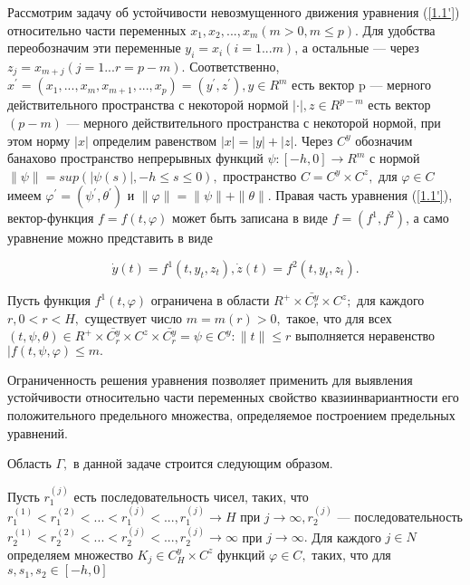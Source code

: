 	Рассмотрим задачу об устойчивости невозмущенного движения уравнения (\ref{1.1'}) относительно части переменных $x_1, x_2, ... , x_m (m > 0, m \le p).$ Для удобства переобозначим эти переменные $y_i = x_i (i = 1...m)$, а остальные --- через $z_j = x_{m+j} (j = 1...r = p - m).$ Соответственно, $x^{'} = (x_1, ... , x_m, x_{m+1}, ..., x_p) = (y^{'}, z^{'}), y \in R^m$ есть вектор p --- мерного действительного пространства с некоторой нормой $|\cdot|, z \in R^{p-m}$ есть вектор $(p-m)$ --- мерного действительного пространства с некоторой нормой, при этом норму $|x|$ определим равенством $|x| = |y| + |z|.$ Через $C^y$ обозначим банахово пространство непрерывных функций $\psi : [-h, 0] \to R^m$ с нормой $\| \psi \| = sup(| \psi(s) |, -h \le s \le 0),$ пространство $C = C^y \times C^z,$ для $\varphi \in C$ имеем $\varphi^{'} = (\psi^{'}, \theta^{'})$ и $\| \varphi \| = \| \psi \| + \| \theta \|.$ Правая часть уравнения (\ref{1.1'}), вектор-функция $f = f(t, \varphi)$ может быть записана в виде $f = (f^1, f^2)$, а само уравнение можно представить в виде 
	
	\begin{equation}
	\dot y(t) = f^1(t, y_t, z_t), \dot z(t) = f^2(t, y_t, z_t).
	\end{equation}
	
	\begin{definition}\label{AS1} Пусть функция $f^1(t, \varphi)$ ограничена в области $R^+ \times \bar{C_r^y} \times C^z; $ для каждого $r, 0 < r < H,$ существует число $m = m(r) > 0,$ такое, что для всех $(t, \psi, \theta) \in R^+ \times \bar{C_r^y} \times C^z \times \bar{C_r^y} = {\psi \in C^y : \| t \| \le r}$ выполняется неравенство $| f(t, \psi, \varphi) \le m .$
	\end{definition}

Ограниченность решения уравнения позволяет применить для выявления устойчивости относительно части переменных свойство квазиинвариантности его положительного предельного множества, определяемое построением предельных уравнений.
	
	Область $\Gamma, $ в данной задаче строится следующим образом. 
	
	Пусть ${r^{(j)}_1}$ есть последовательность чисел, таких, что $r^{(1)}_1 < r^{(2)}_1 < ... < r^{(j)}_1 < ..., r^{(j)}_1 \to H $ при $j \to \infty, {r^{(j)}_2}$ --- последовательность $r^{(1)}_2 < r^{(2)}_2 < ... < r^{(j)}_2 < ..., r^{(j)}_2 \to \infty $ при $j \to \infty.$ Для каждого $j \in N$ определяем множество $K_j \in C^y_H \times C^z$ функций $\varphi \in C,$ таких, что для $s, s_1, s_2 \in [-h, 0]$
		
